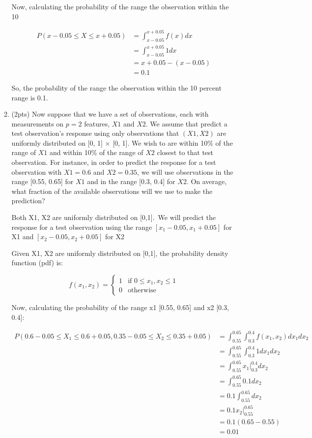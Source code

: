 \documentclass[a4paper]{article}
\theoremstyle{definition}
\newenvironment{soln}{
    \leavevmode\color{blue}\ignorespaces
}{}
\begin{document}
\begin{enumerate}
\begin{enumerate}
\begin{soln}
		Now, calculating the probability of the range the observation within the 10%
		
		$$  
		\begin{align}
		P(x - 0.05 \leq X \leq x + 0.05) &= \int_{x - 0.05}^{x + 0.05} f(x) dx \\
		&= \int_{x - 0.05}^{x + 0.05} 1 dx \\
		&= x + 0.05 - (x - 0.05) \\
		&= 0.1
		\end{align}
		$$
		
		So, the probability of the range the observation within the 10 percent range is 0.1. \end{soln}
	
	
	\item (2pts) Now suppose that we have a set of observations, each with measurements on $p =2$ features, $X1$ and $X2$. We assume that predict a test observation’s response using only observations that $(X1,X2)$ are uniformly distributed on [0, 1] × [0, 1]. We wish to are within 10\% of the range of $X1$ and within 10\% of the range of $X2$ closest to that test observation. For instance, in order to predict the response for a test observation with $X1 =0.6$ and $X2 =0.35$, we will use observations in the range [0.55, 0.65] for $X1$ and in the range [0.3, 0.4] for $X2$. On average, what fraction of the available observations will we use to make the prediction?
	
	\begin{soln}  Both X1, X2 are uniformly distributed on [0,1].\
		We will predict the response for a test observation using the range $[x_{1} - 0.05, x_{1} + 0.05]$ for X1 and $[x_{2} - 0.05, x_{2} + 0.05]$ for X2
		
		Given X1, X2 are uniformly distributed on [0,1], the probability density function (pdf) is:
		
		$$
		f(x_{1}, x_{2}) = \begin{cases}
		1 & \text{if } 0 \leq x_{1}, x_{2} \leq 1 \\
		0 & \text{otherwise}
		\end{cases}
		$$
		
		Now, calculating the probability of the range x1 [0.55, 0.65] and x2 [0.3, 0.4]:
		
		$$
		\begin{align}
		P(0.6 - 0.05 \leq X_{1} \leq 0.6 + 0.05, 0.35 - 0.05 \leq X_{2} \leq 0.35 + 0.05) &= \int_{0.55}^{0.65} \int_{0.3}^{0.4} f(x_{1}, x_{2}) dx_{1} dx_{2} \\
		&= \int_{0.55}^{0.65} \int_{0.3}^{0.4} 1 dx_{1} dx_{2} \\
		&= \int_{0.55}^{0.65} x_{1} \Big|_{0.3}^{0.4} dx_{2} \\
		&= \int_{0.55}^{0.65} 0.1 dx_{2} \\
		&= 0.1 \int_{0.55}^{0.65} dx_{2} \\
		&= 0.1 x_{2} \Big|_{0.55}^{0.65} \\
		&= 0.1 (0.65 - 0.55) \\
		&= 0.01
		\end{align}
		$$
		

\end{soln}
\end{enumerate}
\end{enumerate}
\end{document}
